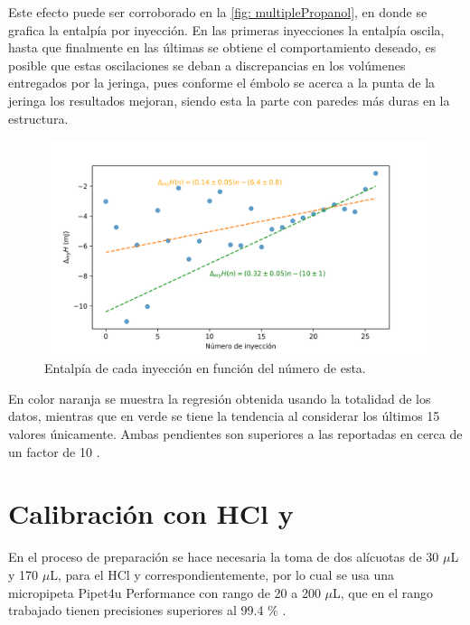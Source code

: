 		Este efecto puede ser corroborado en la \autoref{fig: multiplePropanol}, en donde se grafica la entalp\'ia por inyecci\'on. En las primeras inyecciones la entalp\'ia oscila, hasta que finalmente en las \'ultimas se obtiene el comportamiento deseado, es posible que estas oscilaciones se deban a discrepancias en los vol\'umenes entregados por la jeringa, pues conforme el \'embolo se acerca a la punta de la jeringa los resultados mejoran, siendo esta la parte con paredes m\'as duras en la estructura.
		\begin{figure}[h]
			\centering
			\includegraphics[width=\linewidth]{../Data/ChemicalCalibrations/multipleInt}
			\caption{Entalp\'ia de cada inyecci\'on en funci\'on del n\'umero de esta.}
			\label{fig: multiplePropanol}
		\end{figure}
	
		En color naranja se muestra la regresi\'on obtenida usando la totalidad de los datos, mientras que en verde se tiene la tendencia al considerar los \'ultimos 15 valores \'unicamente. Ambas pendientes son superiores a las reportadas en cerca de un factor de 10 \cite{demarse2011calibration, nanoitc}.
\section{Calibraci\'on con HCl y }\label{sec: soluciones}
	 En el proceso de preparaci\'on se hace necesaria la toma de dos al\'icuotas de 30 $\mu$L y 170 $\mu$L, para el HCl y  correspondientemente, por lo cual se usa una micropipeta Pipet4u Performance con rango de 20 a 200 $\mu$L, que en el rango trabajado tienen precisiones superiores al 99.4 \% \cite{pipet4u}.
	
